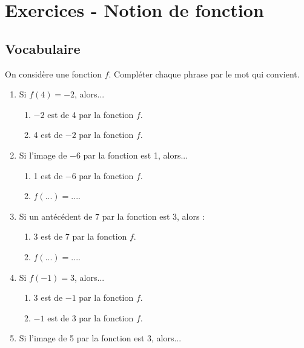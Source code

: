 \section*{Exercices - Notion de fonction}
{\setlength{\columnseprule}{0pt}
\setcounter{NumEx}{1}

\subsection*{Vocabulaire}


\begin{Exercice}%
On considère une fonction \( f \). Compléter chaque phrase par le mot qui convient.
\begin{enumerate}
    \item Si \( f(4) = -2 \), alors...
    \begin{enumerate}
        \item $ -2 $ est \phantom{l'image} de 4 par la fonction \( f \).
        \item 4 est \phantom{un antécédent} de $ -2 $ par la fonction \( f \).
    \end{enumerate}
    \item Si l'image de $ -6 $ par la fonction est 1, alors...
    \begin{enumerate}
        \item 1 est \phantom{l'image} de $ -6 $ par la fonction \( f \).
        \item \( f(...) = ... \).
    \end{enumerate}
    \item Si un antécédent de 7 par la fonction est 3, alors :
    \begin{enumerate}
        \item 3 est \phantom{un antécédent} de 7 par la fonction \( f \).
        \item \( f(...) = ... \).
    \end{enumerate}
    \item Si \( f(-1) = 3 \), alors...
    \begin{enumerate}
        \item 3 est \phantom{l'image} de $ -1 $ par la fonction \( f \).
        \item $ -1 $ est \phantom{un antécédent} de 3 par la fonction \( f \).
    \end{enumerate}
    \item Si l'image de 5 par la fonction est 3, alors...
    \begin{enumerate}

\end{enumerate}
\end{enumerate}
\end{Exercice}}
